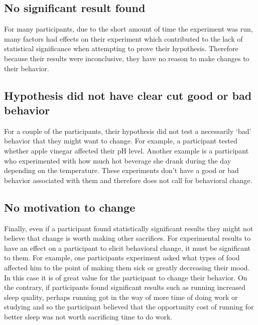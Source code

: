     \subsection{No significant result found}
    For many participants, due to the short amount of time the experiment was run, many factors had effects on their experiment which contributed to the lack of statistical significance when attempting to prove their hypothesis. Therefore because their results were inconclusive, they have no reason to make changes to their behavior.
    \subsection{Hypothesis did not have clear cut good or bad behavior}
    For a couple of the participants, their hypothesis did not test a necessarily ‘bad’ behavior that they might want to change. For example, a participant tested whether apple vinegar affected their pH level. Another example is a participant who experimented with how much hot beverage she drank during the day depending on the temperature. These experiments don’t have a good or bad behavior associated with them and therefore does not call for behavioral change. 
    \subsection{No motivation to change}
    Finally, even if a participant found statistically significant results they might not believe that change is worth making other sacrifices. For experimental results to have an effect on a participant to elicit behavioral change, it must be significant to them. For example, one participants experiment asked what types of food affected him to the point of making them sick or greatly decreasing their mood. In this case it is of great value for the participant to change their behavior. On the contrary, if participants found significant results such as running increased sleep quality, perhaps running got in the way of more time of doing work or studying and so the participant believed that the opportunity cost of running for better sleep was not worth sacrificing time to do work. 
